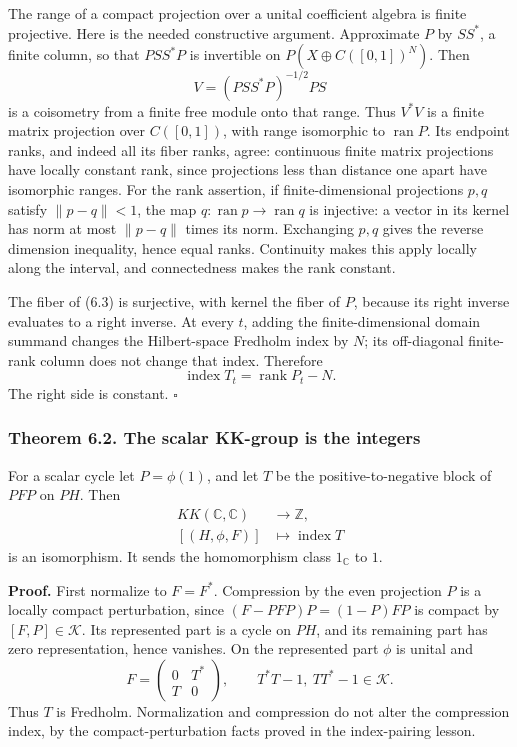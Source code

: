 \documentclass[
  11pt,
]{article}
\begin{document}
The range of a compact projection over a unital coefficient algebra is
finite projective. Here is the needed constructive argument. Approximate
\(P\) by \(SS^*\), a finite column, so that \(PSS^*P\) is invertible on
\(P(X\oplus C([0,1])^N)\). Then \[
V=(PSS^*P)^{-1/2}PS
\] is a coisometry from a finite free module onto that range. Thus
\(V^*V\) is a finite matrix projection over \(C([0,1])\), with range
isomorphic to \(\operatorname{ran}P\). Its endpoint ranks, and indeed
all its fiber ranks, agree: continuous finite matrix projections have
locally constant rank, since projections less than distance one apart
have isomorphic ranges. For the rank assertion, if finite-dimensional
projections \(p,q\) satisfy \(\|p-q\|<1\), the map
\(q:\operatorname{ran}p\to\operatorname{ran}q\) is injective: a vector
in its kernel has norm at most \(\|p-q\|\) times its norm. Exchanging
\(p,q\) gives the reverse dimension inequality, hence equal ranks.
Continuity makes this apply locally along the interval, and
connectedness makes the rank constant.

The fiber of (6.3) is surjective, with kernel the fiber of \(P\),
because its right inverse evaluates to a right inverse. At every \(t\),
adding the finite-dimensional domain summand changes the Hilbert-space
Fredholm index by \(N\); its off-diagonal finite-rank column does not
change that index. Therefore \[
\operatorname{index}T_t=\operatorname{rank}P_t-N.
\tag{6.5}
\] The right side is constant. \(\square\)

\subsubsection{Theorem 6.2. The scalar KK-group is the
integers}\label{theorem-6.2.-the-scalar-kk-group-is-the-integers}

For a scalar cycle let \(P=\phi(1)\), and let \(T\) be the
positive-to-negative block of \(PFP\) on \(PH\). Then \[
\begin{aligned}
KK(\mathbb C,\mathbb C)&\longrightarrow\mathbb Z,\\
[(H,\phi,F)]&\longmapsto\operatorname{index}T
\end{aligned}
\tag{6.6}
\] is an isomorphism. It sends the homomorphism class \(1_{\mathbb C}\)
to \(1\).

\textbf{Proof.} First normalize to \(F=F^*\). Compression by the even
projection \(P\) is a locally compact perturbation, since
\((F-PFP)P=(1-P)FP\) is compact by \([F,P]\in\mathcal K\). Its
represented part is a cycle on \(PH\), and its remaining part has zero
representation, hence vanishes. On the represented part \(\phi\) is
unital and \[
F=\begin{pmatrix}0&T^*\\T&0\end{pmatrix},
\qquad T^*T-1,\ TT^*-1\in\mathcal K.
\] Thus \(T\) is Fredholm. Normalization and compression do not alter
the compression index, by the compact-perturbation facts proved in the
index-pairing lesson.
\end{document}
